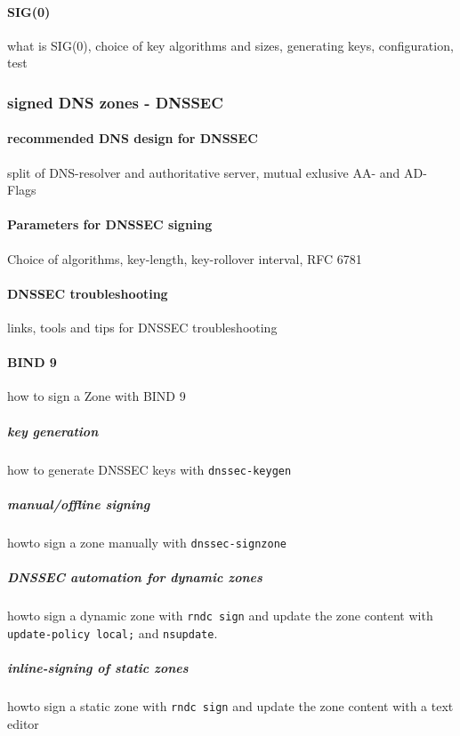 \paragraph{SIG(0)}
what is SIG(0), choice of key algorithms and sizes, generating keys,
configuration, test

\subsubsection{signed DNS zones - DNSSEC}

\paragraph{recommended DNS design for DNSSEC}

split of DNS-resolver and authoritative server, mutual exlusive AA-
and AD-Flags

\paragraph{Parameters for DNSSEC signing}

Choice of algorithms, key-length, key-rollover interval, RFC 6781

\paragraph{DNSSEC troubleshooting}

links, tools and tips for DNSSEC troubleshooting

\paragraph{BIND 9}

how to sign a Zone with BIND 9

\subparagraph{key generation}

how to generate DNSSEC keys with \verb|dnssec-keygen|

\subparagraph{manual/offline signing}

howto sign a zone manually with \verb|dnssec-signzone|

\subparagraph{DNSSEC automation for dynamic zones}

howto sign a dynamic zone with \verb|rndc sign| and update the zone
content with \verb|update-policy local;| and \verb|nsupdate|.

\subparagraph{inline-signing of static zones}

howto sign a static zone with \verb|rndc sign| and update the zone
content with a text editor

